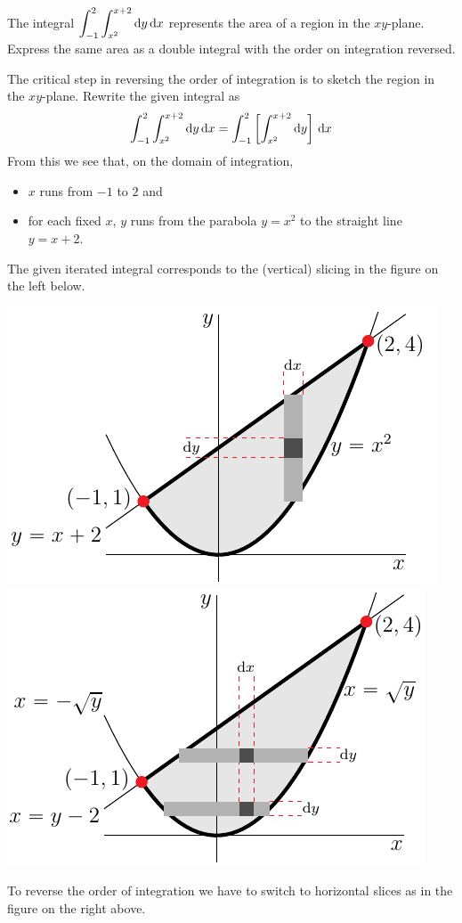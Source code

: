 \begin{eg}\label{eg dblInt D}
The integral $\displaystyle\int_{-1}^2\int_{x^2}^{x+2}\mathrm{d}y\,\mathrm{d}x$
represents the area of a region in the $xy$-plane. Express the same area
as a double integral with the order on integration reversed.

\soln The critical step in reversing the order of integration is
to sketch the region in the $xy$-plane. Rewrite the given integral as
\begin{equation*}
\int_{-1}^2\int_{x^2}^{x+2}\mathrm{d}y\,\mathrm{d}x
=\int_{-1}^2\left[\int_{x^2}^{x+2}\mathrm{d}y\right]\,\mathrm{d}x
\end{equation*}
From this we see that, on the domain of integration,
\begin{itemize}
\item
$x$ runs from $-1$ to $2$ and
\item
for each fixed $x$, $y$ runs from the parabola $y=x^2$ to the straight line $y=x+2$.
\end{itemize}
The given iterated integral corresponds to the (vertical) slicing in the figure
on the left below.
\begin{wfig}
\begin{center}
   \includegraphics{reverseA.pdf}\ 
   \includegraphics{reverseB.pdf}
\end{center}
\end{wfig}
To reverse the order of integration we have to switch to horizontal
slices as in the figure on the right above. 


\end{eg}
